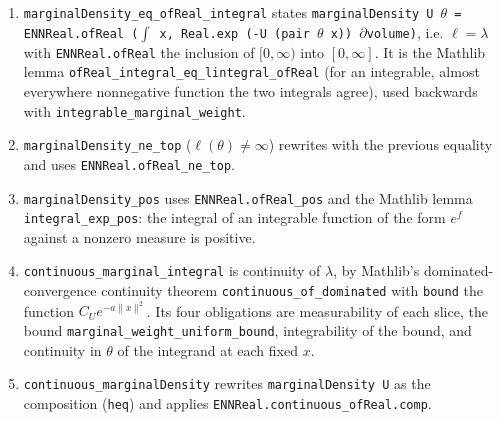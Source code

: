 \documentclass[11pt,a4paper]{report}
\begin{document}
\begin{leanbox}
\begin{enumerate}
\item \texttt{marginal\allowbreak{}Density\_\allowbreak{}eq\_\allowbreak{}of\allowbreak{}Real\_\allowbreak{}integral} states \texttt{marginal\allowbreak{}Density U \ensuremath{\theta} = ENNReal.\allowbreak{}of\allowbreak{}Real (\ensuremath{\int} x, Real.\allowbreak{}exp (-\allowbreak{}U (pair \ensuremath{\theta} x)) \ensuremath{\partial}volume)}, i.e. \(\ell=\lambda\) with \texttt{ENNReal.\allowbreak{}of\allowbreak{}Real} the inclusion of \([0,\infty)\) into \([0,\infty]\). It is the Mathlib lemma \texttt{of\allowbreak{}Real\_\allowbreak{}integral\_\allowbreak{}eq\_\allowbreak{}lintegral\_\allowbreak{}of\allowbreak{}Real} (for an integrable, almost everywhere nonnegative function the two integrals agree), used backwards with \texttt{integrable\_\allowbreak{}marginal\_\allowbreak{}weight}.

\item \texttt{marginal\allowbreak{}Density\_\allowbreak{}ne\_\allowbreak{}top} (\(\ell(\theta)\ne\infty\)) rewrites with the previous equality and uses \texttt{ENNReal.\allowbreak{}of\allowbreak{}Real\_\allowbreak{}ne\_\allowbreak{}top}.

\item \texttt{marginal\allowbreak{}Density\_\allowbreak{}pos} uses \texttt{ENNReal.\allowbreak{}of\allowbreak{}Real\_\allowbreak{}pos} and the Mathlib lemma \texttt{integral\_\allowbreak{}exp\_\allowbreak{}pos}: the integral of an integrable function of the form \(e^{f}\) against a nonzero measure is positive.

\item \texttt{continuous\_\allowbreak{}marginal\_\allowbreak{}integral} is continuity of \(\lambda\), by Mathlib's dominated-convergence continuity theorem \texttt{continuous\_\allowbreak{}of\_\allowbreak{}dominated} with \texttt{bound} the function \(C_Ue^{-a\|x\|^2}\). Its four obligations are measurability of each slice, the bound \texttt{marginal\_\allowbreak{}weight\_\allowbreak{}uniform\_\allowbreak{}bound}, integrability of the bound, and continuity in \(\theta\) of the integrand at each fixed \(x\).

\item \texttt{continuous\_\allowbreak{}marginal\allowbreak{}Density} rewrites \texttt{marginal\allowbreak{}Density U} as the composition (\texttt{heq}) and applies \texttt{ENNReal.\allowbreak{}continuous\_\allowbreak{}of\allowbreak{}Real.\allowbreak{}comp}.

\end{enumerate}
\end{leanbox}
\end{document}
